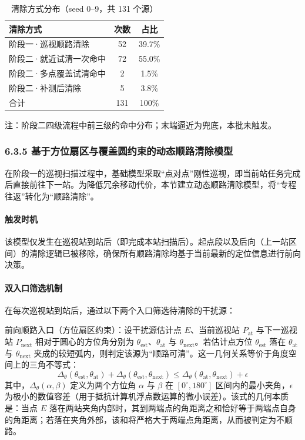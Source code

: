 \documentclass[UTF8, zihao=5,AutoFakeBold=2]{ctexart}
\begin{document}
\begin{table}[H]
    \centering
    \caption{ 清除方式分布（seed 0--9，共 131 个源）}
    \label{tab:t3-methods}
    \begin{tabular}{lcc}
        \toprule
        清除方式 & 次数 & 占比 \\
        \midrule
        阶段一·巡视顺路清除 & 52 & 39.7\% \\
        阶段二·就近试清一次命中 & 72 & 55.0\% \\
        阶段二·多点覆盖试清命中 & 2 & 1.5\% \\
        阶段二·补测后清除 & 5 & 3.8\% \\
        \midrule
        合计 & 131 & 100\% \\
        \bottomrule
    \end{tabular}
    \par\smallskip
    \footnotesize{注：阶段二四级流程中前三级的命中分布；末端逼近为兜底，本批未触发。}
\end{table}

\subsubsection*{6.3.5 基于方位扇区与覆盖圆约束的动态顺路清除模型}

在阶段一的巡视扫描过程中，基础模型采取“点对点”刚性巡视，即当前站任务完成后直接前往下一站。为降低冗余移动代价，本节建立动态顺路清除模型，将“专程往返”转化为“顺路清除”。

\paragraph{触发时机}
该模型仅发生在巡视站到站后（即完成本站扫描后）。起点段以及后向（上一站区间）的清除逻辑已被移除，确保所有顺路清除均基于当前最新的定位信息进行前向决策。

\paragraph{双入口筛选机制}
在每次巡视站到站后，通过以下两个入口筛选待清除的干扰源：

    前向顺路入口（方位扇区约束）：设干扰源估计点 \(E\)、当前巡视站 \(P_{\text{at}}\) 与下一巡视站 \(P_{\text{next}}\) 相对于圆心的方位角分别为 \(\theta_{\text{est}}\)、\(\theta_{\text{at}}\) 与 \(\theta_{\text{next}}\)。若估计点方位 \(\theta_{\text{est}}\) 落在 \(\theta_{\text{at}}\) 与 \(\theta_{\text{next}}\) 夹成的较短弧内，则判定该源为“顺路可清”。这一几何关系等价于角度空间上的三角不等式：
    \begin{equation}
    \Delta_\theta(\theta_{\text{est}}, \theta_{\text{at}}) + \Delta_\theta(\theta_{\text{est}}, \theta_{\text{next}}) \leq \Delta_\theta(\theta_{\text{at}}, \theta_{\text{next}}) + \epsilon
    \end{equation}
    其中，\(\Delta_\theta(\alpha, \beta)\) 定义为两个方位角 \(\alpha\) 与 \(\beta\) 在 \([0^\circ, 180^\circ]\) 区间内的最小夹角，\(\epsilon\) 为极小的数值容差（用于抵抗计算机浮点数运算的微小误差）。该式的几何本质是：当点 \(E\) 落在两站夹角内部时，其到两端点的角距离之和恰好等于两端点自身的角距离；若落在夹角外部，该和将严格大于两端点角距离，从而被判定为不顺路。
    
\end{document}
